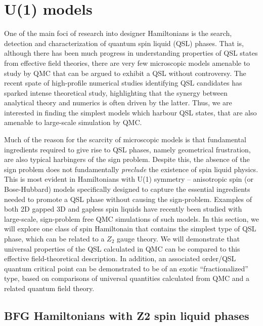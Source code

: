 \documentclass[range]{ar2e}
\begin{document}
\section{U(1) models}
\label{sec:u1models}

One of the main foci of research into designer Hamiltonians is the search, detection and characterization of quantum spin liquid (QSL) phases.  
That is, although there has been much progress in understanding properties of QSL states from effective field theories, there are very few microscopic models amenable to study by QMC that can be argued to exhibit a QSL without controversy.
The recent spate of high-profile numerical studies identifying QSL candidates \cite{Yan, Meng,J1J2} has sparked intense theoretical study, highlighting that the synergy between analytical theory and numerics is often driven by the latter.  Thus, we are interested in finding the simplest models which harbour QSL states, that are also amenable to large-scale simulation by QMC.

Much of the reason for the scarcity of microscopic models is that fundamental ingredients required to give rise to QSL phases, namely geometrical frustration, are also typical harbingers of the sign problem.  Despite this, the absence of the sign problem does not fundamentally {\it preclude} the existence of spin liquid physics.  This is most evident in Hamiltonians with U(1) symmetry -- anisotropic spin (or Bose-Hubbard) models specifically designed to capture the essential ingredients needed to promote a QSL phase without causing the sign-problem.  
Examples of both 2D gapped \cite{Isakov1,Isakov2,Long,TopoEE} 3D and gapless \cite{Isakov3} spin liquids have recently been studied with large-scale, sign-problem free QMC simulations of such models.
In this section, we will explore one class of spin Hamiltonain that contains the simplest type of QSL phase, which can be related to a $Z_2$ gauge theory.  We will demonstrate that universal properties of the QSL calculated in QMC can be compared to this
effective field-theoretical description.  In addition, an associated order/QSL quantum critical point can be demonstrated to be of an exotic
``fractionalized'' type, based on comparisons of universal quantities calculated from QMC and a related quantum field theory.

\subsection{BFG Hamiltonians with Z2 spin liquid phases}
\end{document}
